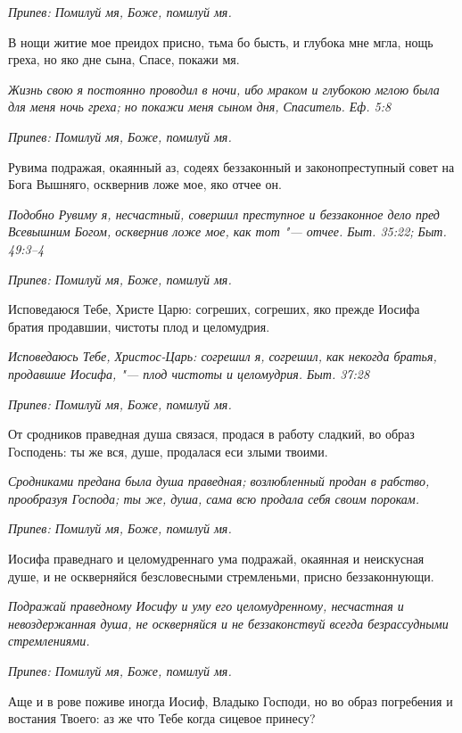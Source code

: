 \itshape Припев:\normalfont{} Помилуй мя, Боже, помилуй мя.


В нощи житие мое преидох присно, тьма бо бысть, и глубока мне мгла, нощь греха, но яко дне сына, Спасе, покажи мя.


\itshape Жизнь свою я постоянно проводил в ночи, ибо мраком и глубокою мглою была для меня ночь греха; но покажи меня сыном дня, Спаситель. Еф. 5:8\normalfont{}


\itshape Припев:\normalfont{} Помилуй мя, Боже, помилуй мя.


Рувима подражая, окаянный аз, содеях беззаконный и законопреступный совет на Бога Вышняго, осквернив ложе мое, яко отчее он.


\itshape Подобно Рувиму я, несчастный, совершил преступное и беззаконное дело пред Всевышним Богом, осквернив ложе мое, как тот "--- отчее. Быт. 35:22; Быт. 49:3–4\normalfont{}


\itshape Припев:\normalfont{} Помилуй мя, Боже, помилуй мя.


Исповедаюся Тебе, Христе Царю: согреших, согреших, яко прежде Иосифа братия продавшии, чистоты плод и целомудрия.


\itshape Исповедаюсь Тебе, Христос-Царь: согрешил я, согрешил, как некогда братья, продавшие Иосифа, "--- плод чистоты и целомудрия. Быт. 37:28\normalfont{}


\itshape Припев:\normalfont{} Помилуй мя, Боже, помилуй мя.


От сродников праведная душа связася, продася в работу сладкий, во образ Господень: ты же вся, душе, продалася еси злыми твоими.


\itshape Сродниками предана была душа праведная; возлюбленный продан в рабство, прообразуя Господа; ты же, душа, сама всю продала себя своим порокам.\normalfont{}


\itshape Припев:\normalfont{} Помилуй мя, Боже, помилуй мя.


Иосифа праведнаго и целомудреннаго ума подражай, окаянная и неискусная душе, и не оскверняйся безсловесными стремленьми, присно беззаконнующи.


\itshape Подражай праведному Иосифу и уму его целомудренному, несчастная и невоздержанная душа, не оскверняйся и не беззаконствуй всегда безрассудными стремлениями.\normalfont{}


\itshape Припев:\normalfont{} Помилуй мя, Боже, помилуй мя.


Аще и в рове поживе иногда Иосиф, Владыко Господи, но во образ погребения и востания Твоего: аз же что Тебе когда сицевое принесу?


